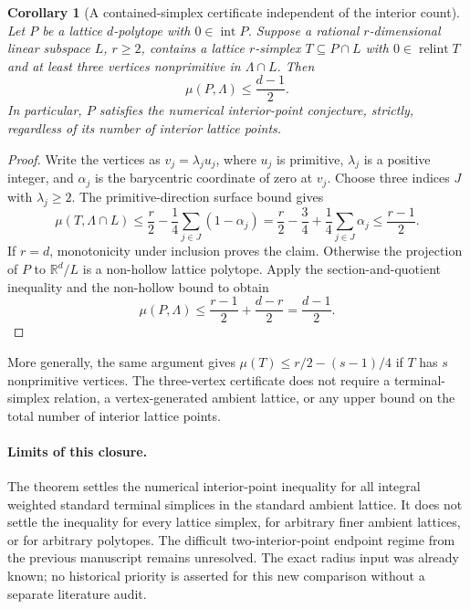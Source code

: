 \documentclass[11pt,a4paper]{article}
\newtheorem{corollary}[theorem]{Corollary}
\theoremstyle{remark}\newtheorem{remark}[theorem]{Remark}
\begin{document}
\begin{corollary}[A contained-simplex certificate independent of the interior count]
\label{r4d:witness}
Let $P$ be a lattice $d$-polytope with $0\in\operatorname{int}P$.
Suppose a rational $r$-dimensional linear subspace $L$, $r\ge2$,
contains a lattice $r$-simplex $T\subseteq P\cap L$ with
$0\in\operatorname{relint}T$ and at least three vertices nonprimitive
in $\Lambda\cap L$.
Then
\[
 \mu(P,\Lambda)\le\frac{d-1}{2}.
\]
In particular, $P$ satisfies the numerical interior-point conjecture,
strictly, regardless of its number of interior lattice points.
\end{corollary}
\begin{proof}
Write the vertices as $v_j=\lambda_j u_j$, where $u_j$ is primitive,
$\lambda_j$ is a positive integer, and $\alpha_j$ is the barycentric
coordinate of zero at $v_j$. Choose three indices $J$ with
$\lambda_j\ge2$. The primitive-direction surface bound gives
\[
 \mu(T,\Lambda\cap L)
 \le\frac r2-\frac14\sum_{j\in J}(1-\alpha_j)
 =\frac r2-\frac34+\frac14\sum_{j\in J}\alpha_j
 \le\frac{r-1}{2}.
\]
If $r=d$, monotonicity under inclusion proves the claim.
Otherwise the projection of $P$ to $\mathbb R^d/L$ is a non-hollow
lattice polytope. Apply the section-and-quotient inequality and the
non-hollow bound to obtain
\[
 \mu(P,\Lambda)
 \le\frac{r-1}{2}+\frac{d-r}{2}=\frac{d-1}{2}.
\]
\end{proof}

More generally, the same argument gives
$\mu(T)\le r/2-(s-1)/4$ if $T$ has $s$ nonprimitive vertices.
The three-vertex certificate does not require a terminal-simplex
relation, a vertex-generated ambient lattice, or any upper bound on
the total number of interior lattice points.

\paragraph{Limits of this closure.}
The theorem settles the numerical interior-point inequality for all
integral weighted standard terminal simplices in the standard ambient
lattice. It does not settle the inequality for every lattice simplex,
for arbitrary finer ambient lattices, or for arbitrary polytopes.
The difficult two-interior-point endpoint regime from the previous
manuscript remains unresolved. The exact radius input was already known;
no historical priority is asserted for this new comparison without a
separate literature audit.


\end{document}
